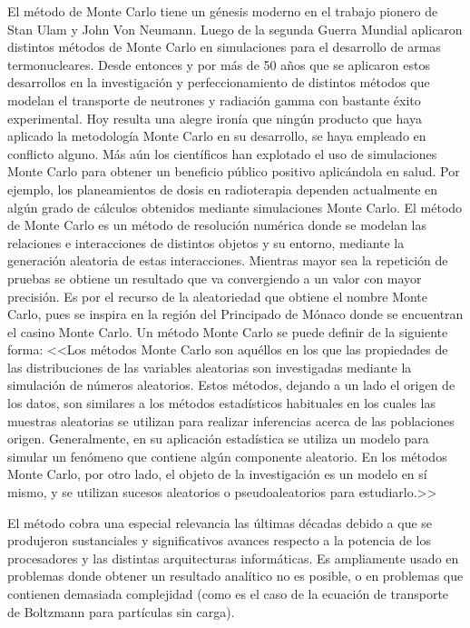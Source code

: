 \documentclass[sigconf, nonacm]{acmart}
\begin{document}
El método de Monte Carlo tiene un génesis moderno en el trabajo pionero de Stan Ulam y John Von Neumann. Luego de la segunda Guerra Mundial aplicaron distintos métodos de Monte Carlo en simulaciones para el desarrollo de armas termonucleares. Desde entonces y por más de 50 años que se aplicaron estos desarrollos en la investigación y perfeccionamiento de distintos métodos que modelan el transporte de neutrones y radiación gamma con bastante éxito experimental.\cite{Andreas}
Hoy resulta una alegre ironía que ningún producto que haya aplicado la metodología Monte Carlo en su desarrollo, se haya empleado en conflicto alguno. Más aún los científicos han explotado el uso de simulaciones Monte Carlo para obtener un beneficio público positivo aplicándola en salud. Por ejemplo, los planeamientos de dosis en radioterapia dependen actualmente en algún grado de cálculos obtenidos mediante simulaciones Monte Carlo. 
El método de Monte Carlo es un método de resolución numérica donde se modelan las relaciones e interacciones de distintos objetos y su entorno, mediante la generación aleatoria de estas interacciones. Mientras mayor sea la repetición de pruebas se obtiene un resultado que va convergiendo a un valor con mayor precisión. Es por el recurso de la aleatoriedad que obtiene el nombre Monte Carlo, pues se inspira en la región del Principado de Mónaco donde se encuentran el casino Monte Carlo. 
Un método Monte Carlo se puede definir de la siguiente forma: <<Los métodos Monte Carlo son aquéllos en los que las propiedades de las distribuciones de las variables aleatorias son investigadas mediante la simulación de números aleatorios. Estos métodos, dejando a un lado el origen de los datos, son similares a los métodos estadísticos habituales en los cuales las muestras aleatorias se utilizan para realizar inferencias acerca de las poblaciones origen. Generalmente, en su aplicación estadística se utiliza un modelo para simular un fenómeno que contiene algún componente aleatorio. En los métodos Monte Carlo, por otro lado, el objeto de la investigación es un modelo en sí mismo, y se utilizan sucesos 
aleatorios o pseudoaleatorios para estudiarlo.>> \cite{Gentle}

El método cobra una especial relevancia las últimas décadas debido a que se produjeron sustanciales y significativos avances respecto a la potencia de los procesadores y las distintas arquitecturas informáticas. Es ampliamente usado en problemas donde obtener un resultado analítico no es posible, o en problemas que contienen demasiada complejidad (como es el caso de la ecuación de transporte de Boltzmann para partículas sin carga).\cite{Andreas}
\end{document}
